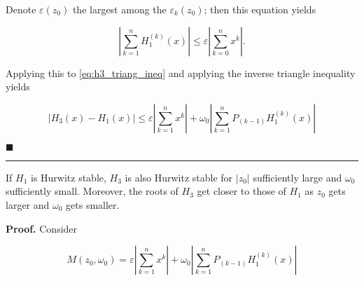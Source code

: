 	Denote $\varepsilon\left(z_0\right)$ the largest among the $\varepsilon_k\left(z_0\right)$; then this equation yields

\begin{equation} \left\lvert\sum_{k=1}^n H_1^{(k)}(x)\right\rvert \leq \varepsilon \left\lvert\sum_{k=0}^n x^k\right\rvert .\end{equation}

	Applying this to \eqref{eq:h3_triang_ineq} and applying the inverse triangle inequality yields

\begin{equation} \left\lvert H_3(x) - H_1(x)\right\rvert \leq \varepsilon\left\lvert\sum_{k=1}^n x^k\right\rvert + \omega_0 \left\lvert \sum_{k=1}^n P_{(k-1)}H_1^{(k)}(x)\right\rvert \label{eq:h3_ineq_qsg}\end{equation}

\hfill$\blacksquare$ \vspace{3mm}\hrule\vspace{3mm} %
\begin{corollary}\label{corollary:h3_h1_roots_qsh} %
	If $H_1$ is Hurwitz stable, $H_3$ is also Hurwitz stable for $\left\lvert z_0\right\rvert$ sufficiently large and $\omega_0$ sufficiently small. Moreover, the roots of $H_3$ get closer to those of $H_1$ as $z_0$ gets larger and $\omega_0$ gets smaller.
\end{corollary}
\textbf{Proof.} Consider

\begin{equation} M\left(z_0,\omega_0\right) = \varepsilon\left\lvert\sum_{k=1}^n x^k\right\rvert + \omega_0 \left\lvert \sum_{k=1}^n P_{(k-1)}H_1^{(k)}(x)\right\rvert \end{equation}


